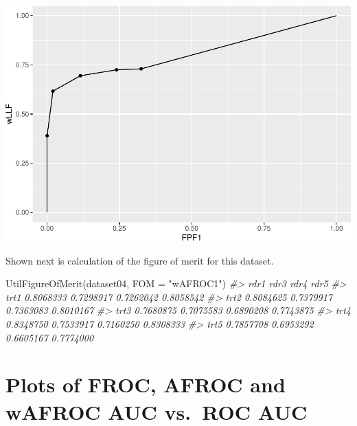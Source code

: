 \documentclass[
]{book}
\newenvironment{Shaded}{\begin{snugshade}}{\end{snugshade}}
\newcommand{\AttributeTok}[1]{\textcolor[rgb]{0.77,0.63,0.00}{#1}}
\newcommand{\CommentTok}[1]{\textcolor[rgb]{0.56,0.35,0.01}{\textit{#1}}}
\newcommand{\DecValTok}[1]{\textcolor[rgb]{0.00,0.00,0.81}{#1}}
\newcommand{\FunctionTok}[1]{\textcolor[rgb]{0.00,0.00,0.00}{#1}}
\newcommand{\NormalTok}[1]{#1}
\newcommand{\OtherTok}[1]{\textcolor[rgb]{0.56,0.35,0.01}{#1}}
\newcommand{\SpecialCharTok}[1]{\textcolor[rgb]{0.00,0.00,0.00}{#1}}
\newcommand{\StringTok}[1]{\textcolor[rgb]{0.31,0.60,0.02}{#1}}
\begin{document}
\begin{Shaded}
\end{Shaded}

\includegraphics{13a-froc-empirical1_files/figure-latex/unnamed-chunk-16-1.pdf}

Shown next is calculation of the figure of merit for this dataset.

\begin{Shaded}
\begin{Highlighting}[]
\FunctionTok{UtilFigureOfMerit}\NormalTok{(dataset04, }\AttributeTok{FOM =} \StringTok{"wAFROC1"}\NormalTok{)}
\CommentTok{\#\textgreater{}           rdr1      rdr3      rdr4      rdr5}
\CommentTok{\#\textgreater{} trt1 0.8068333 0.7298917 0.7262042 0.8058542}
\CommentTok{\#\textgreater{} trt2 0.8084625 0.7379917 0.7363083 0.8010167}
\CommentTok{\#\textgreater{} trt3 0.7680875 0.7075583 0.6890208 0.7743875}
\CommentTok{\#\textgreater{} trt4 0.8348750 0.7533917 0.7160250 0.8308333}
\CommentTok{\#\textgreater{} trt5 0.7857708 0.6953292 0.6605167 0.7774000}
\end{Highlighting}
\end{Shaded}

\hypertarget{froc-empirical-plots}{%
\section{Plots of FROC, AFROC and wAFROC AUC vs.~ROC AUC}\label{froc-empirical-plots}}
\end{document}

